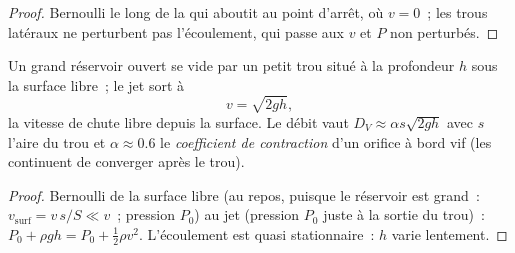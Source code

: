 \begin{proof}
Bernoulli le long de la  qui aboutit au point d'arrêt, où
$v = 0$~; les trous latéraux ne perturbent pas l'écoulement, qui passe aux $v$ et $P$
non perturbés.
\end{proof}

\begin{proposition}\label{prop:b2:euler-bernoulli:torricelli}
Un grand réservoir ouvert se vide par un petit trou situé à la profondeur $h$ sous la
surface libre~; le jet sort à
\[
v = \sqrt{2gh} ,
\]
la vitesse de chute libre depuis la surface. Le débit vaut $D_V \approx
\alpha s\sqrt{2gh}$ avec $s$ l'aire du trou et $\alpha \approx 0.6$ le
\emph{coefficient de contraction} d'un orifice à bord vif (les 
continuent de converger après le trou).
\end{proposition}

\begin{proof}
Bernoulli de la surface libre (au repos, puisque le réservoir est grand~:
$v_{\text{surf}} = v\,s/S \ll v$~; pression $P_0$) au jet (pression $P_0$
juste à la sortie du trou)~: $P_0 + \rho gh = P_0 + \tfrac12\rho v^2$. L'écoulement
est quasi stationnaire~: $h$ varie lentement.
\end{proof}

